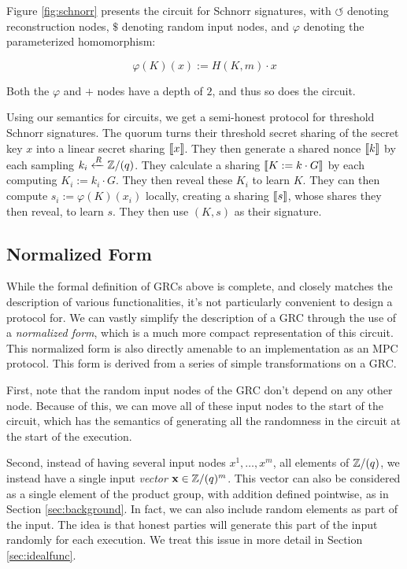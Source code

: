 Figure \ref{fig:schnorr} presents the circuit for Schnorr signatures,
with $\circlearrowleft$ denoting reconstruction nodes,
$\$$ denoting random input nodes, and $\varphi$ denoting
the parameterized homomorphism:

$$
\varphi(K)(x) := H(K, m) \cdot x
$$

Both the $\varphi$ and $+$ nodes have a depth of $2$, and thus so
does the circuit.

Using our semantics for circuits, we get a semi-honest protocol for
threshold Schnorr signatures. The quorum turns their threshold
secret sharing of the secret key $x$ into a linear secret sharing $\llbracket x\rrbracket$.
They then generate a shared nonce $\llbracket k\rrbracket$ by each sampling
$k_i \xleftarrow{R} \mathbb{Z}/(q)$. They calculate a sharing $\llbracket K := k \cdot G\rrbracket$
by each computing $K_i := k_i \cdot G$. They then reveal these $K_i$ to
learn $K$. They can then compute $s_i := \varphi(K)(x_i)$ locally,
creating a sharing $\llbracket s\rrbracket$, whose shares they then reveal,
to learn $s$. They then use $(K, s)$ as their signature.

\subsection{Normalized Form}

While the formal definition of GRCs above is complete, and closely
matches the description of various functionalities, it's not
particularly convenient to design a protocol for.
We can vastly simplify the description of a GRC through the use
of a \emph{normalized form}, which is a much more compact representation
of this circuit.
This normalized form is also directly amenable to an implementation
as an MPC protocol.
This form is derived from a series of simple transformations on
a GRC.

First, note that the random input nodes of the GRC don't depend on
any other node. Because of this, we can move all of these input nodes
to the start of the circuit, which has the semantics of generating
all the randomness in the circuit at the start of the execution.

Second, instead of having several input nodes $x^1, \ldots, x^m$,
all elements of $\mathbb{Z}/(q)$, we
instead have a single input \emph{vector} $\textbf{x} \in \mathbb{Z}/(q)^m$.
This vector can also be considered as a single element of the product
group, with addition defined pointwise, as in Section \ref{sec:background}.
In fact, we can also include random elements as part of the input.
The idea is that honest parties will generate this part of the input
randomly for each execution.
We treat this issue in more detail in Section \ref{sec:idealfunc}.

